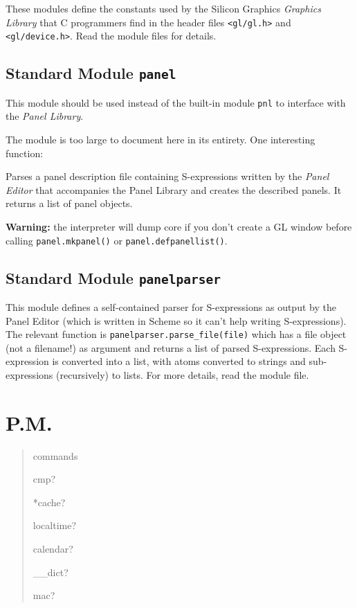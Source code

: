 These modules define the constants used by the Silicon Graphics
{\em Graphics Library}
that C programmers find in the header files
{\tt <gl/gl.h>}
and
{\tt <gl/device.h>}.
Read the module files for details.

\subsection{Standard Module {\tt panel}}

This module should be used instead of the built-in module
{\tt pnl}
to interface with the
{\em Panel Library}.

The module is too large to document here in its entirety.
One interesting function:
\begin{description}
Parses a panel description file containing S-expressions written by the
{\em Panel Editor}
that accompanies the Panel Library and creates the described panels.
It returns a list of panel objects.
\end{description}

{\bf Warning:}
the {\Python} interpreter will dump core if you don't create a GL window
before calling
{\tt panel.mkpanel()}
or
{\tt panel.defpanellist()}.

\subsection{Standard Module {\tt panelparser}}

This module defines a self-contained parser for S-expressions as output
by the Panel Editor (which is written in Scheme so it can't help writing
S-expressions).
The relevant function is
{\tt panelparser.parse\_file(file)}
which has a file object (not a filename!) as argument and returns a list
of parsed S-expressions.
Each S-expression is converted into a {\Python} list, with atoms converted
to {\Python} strings and sub-expressions (recursively) to {\Python} lists.
For more details, read the module file.

\section{P.M.}

\begin{verse}

commands

cmp?

*cache?

localtime?

calendar?

\_\_dict?

mac?

\end{verse}

